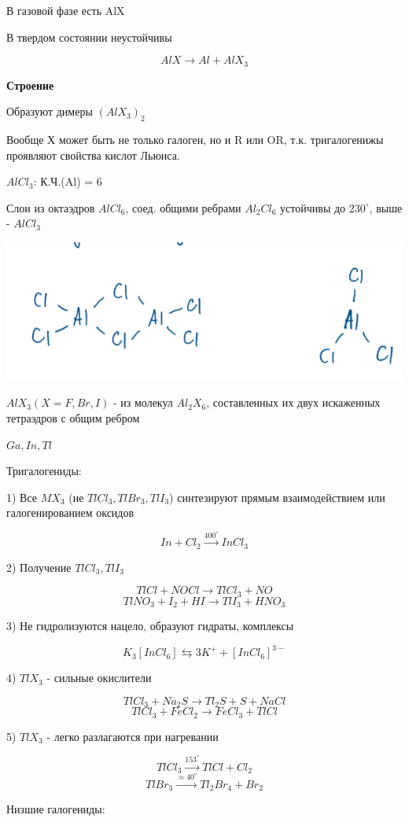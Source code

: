 В газовой фазе есть AlX

В твердом состоянии неустойчивы

$$AlX \rightarrow Al + AlX_3$$

\textbf{Строение}

Образуют димеры $(AlX_3)_2$

Вообще Х может быть не только галоген, но и R или OR, т.к. тригалогенижы проявляют свойства кислот Льюиса.

$AlCl_3$:  К.Ч.(Al) = 6

Слои из  октаэдров $AlCl_6$, соед. общими ребрами $Al_2Cl_6$ устойчивы до $230^{\circ}$, выше - $AlCl_3$ 

\includegraphics{images/11v12.png}

$AlX_3 (X= F, Br, I)$ - из молекул $Al_2X_6$, составленных их двух искаженных тетраэдров с общим ребром


$Ga, In, Tl$

Тригалогениды:

1) Все $MX_3$ (не $TlCl_3, TlBr_3, TlI_3$) синтезируют прямым взаимодействием или галогенированием оксидов

$$In + Cl_2 \xrightarrow{400^{\circ}} InCl_3$$

2) Получение $TlCl_3, TlI_3$

$$TlCl + NOCl \rightarrow TlCl_3 + NO$$
$$TlNO_3 + I_2 + HI \rightarrow TlI_3 + HNO_3$$

3) Не гидролизуются нацело, образуют гидраты, комплексы

$$K_3[InCl_6] \leftrightarrows 3K^+ + [InCl_6]^{3-}$$

4) $TlX_3$ - сильные окислители

$$TlCl_3 + Na_2S \rightarrow Tl_2S + S + NaCl$$
$$TlCl_3 + FeCl_2 \rightarrow FeCl_3 + TlCl$$

5) $TlX_3$ - легко разлагаются при нагревании

$$TlCl_3 \xrightarrow{153^{\circ}} TlCl + Cl_2$$
$$TlBr_3 \xrightarrow{\approx 40^{\circ}} Tl_2Br_4 + Br_2$$

Низшие галогениды:


